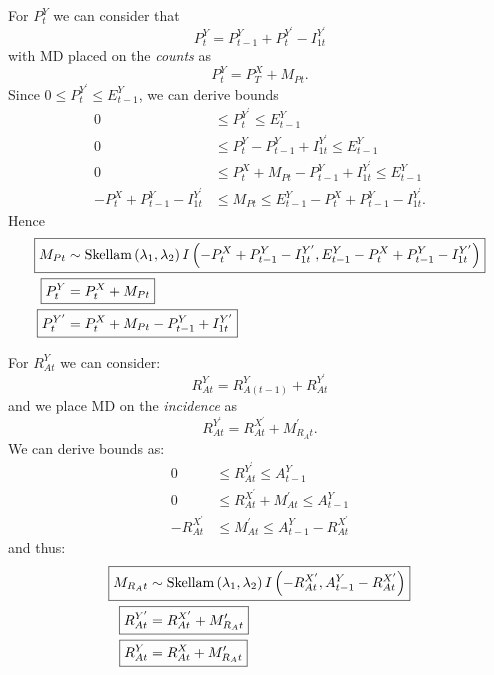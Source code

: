 \documentclass[a4paper]{article}
\begin{document}
For $P^Y_t$ we can consider that
\begin{equation*}
    P^Y_t = P^Y_{t - 1} + P^{Y^\prime}_t - I^{Y^\prime}_{1t}
\end{equation*}
with MD placed on the \textit{counts} as
\begin{equation*}
    P^Y_t = P^X_T + M_{Pt}.
\end{equation*}
Since $0 \leq P^{Y^\prime}_t \leq E^Y_{t - 1}$, we can derive bounds
\begin{align*}
    0 &\leq P^{Y^\prime}_t \leq E^Y_{t - 1}\\
    0 &\leq P^Y_t - P^Y_{t - 1} + I^{Y^\prime}_{1t} \leq E^Y_{t - 1}\\
    0 &\leq P^X_t + M_{Pt} - P^Y_{t - 1} + I^{Y^\prime}_{1t} \leq E^Y_{t - 1}\\
    -P^X_t + P^Y_{t - 1} - I^{Y^\prime}_{1t} &\leq M_{Pt} \leq E^Y_{t - 1} - P^X_t + P^Y_{t - 1} - I^{Y^\prime}_{1t}.
\end{align*}
Hence
\begin{align*}
\Aboxed{M_{Pt} &\sim \mbox{Skellam}\left(\lambda_1, \lambda_2\right)I\left(-P^X_t + P^Y_{t - 1} - I^{Y^\prime}_{1t}, E^Y_{t - 1} - P^X_t + P^Y_{t - 1} - I^{Y^\prime}_{1t}\right)}\\
    \Aboxed{P^Y_t &= P^X_t + M_{Pt}}\\
    \Aboxed{P^{Y^\prime}_t &= P^X_t + M_{Pt} - P^Y_{t - 1} + I^{Y^\prime}_{1t}}
\end{align*}

For $R^Y_{At}$ we can consider:
\begin{equation*}
    R^Y_{At} = R^Y_{A(t - 1)} + R^{Y^\prime}_{At}
\end{equation*}
and we place MD on the \textit{incidence} as
\begin{equation*}
    R^{Y^\prime}_{At} = R^{X^\prime}_{At} + M^\prime_{R_At}.
\end{equation*}
We can derive bounds as:
\begin{align*}
    0 &\leq R^{Y^\prime}_{At} \leq A^Y_{t - 1}\\
    0 &\leq R^{X^\prime}_{At} + M^\prime_{At} \leq A^Y_{t - 1}\\
    -R^{X^\prime}_{At} &\leq  M^\prime_{At} \leq A^Y_{t - 1} - R^{X^\prime}_{At}
\end{align*}
and thus:
\begin{align*}
\Aboxed{M_{R_At} &\sim \mbox{Skellam}\left(\lambda_1, \lambda_2\right)I\left(-R^{X^\prime}_{At}, A^Y_{t - 1} - R^{X^\prime}_{At}\right)}\\
    \Aboxed{R^{Y^\prime}_{At} &= R^{X^\prime}_{At} + M^\prime_{R_At}}\\
    \Aboxed{R^Y_{At} &= R^X_{At} + M^\prime_{R_At}}
\end{align*}
\end{document}
